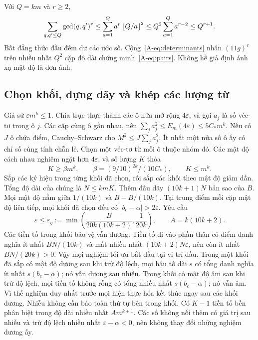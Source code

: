 Với $Q=km$ và $r\ge2$,
\begin{equation}\label{A-eq:gcd}
\sum_{q,q'\le Q}\gcd(q,q')^r
\le\sum_{a=1}^Q a^r\left\lfloor Q/a\right\rfloor^2
\le Q^2\sum_{a=1}^Q a^{r-2}\le Q^{r+1}.
\end{equation}
Bất đẳng thức đầu đếm dư các ước số. Cộng~\eqref{A-eq:determinants} nhân $(11g)^r$ trên nhiều nhất $Q^2$ cặp độ dài chứng minh~\eqref{A-eq:pairs}. Không hề giả định ánh xạ mật độ là đơn ánh.

\subsection{Chọn khối, dựng dãy và khép các lượng từ}
Giả sử $\varepsilon m^k\le1$. Chia trục thực thành các ô nửa mở rộng $4\varepsilon$, và gọi $a_j$ là số véc-tơ trong ô $j$. Các cặp cùng ô gần nhau, nên $\sum_j a_j^2\le E_m(4\varepsilon)\le5C_*m^k$. Nếu có $J$ ô chứa điểm, Cauchy--Schwarz cho $M^2\le J\sum_j a_j^2$. Ít nhất một nửa số ô ấy có chỉ số cùng tính chẵn lẻ. Chọn một véc-tơ từ mỗi ô thuộc nhóm đó. Các mật độ cách nhau nghiêm ngặt hơn $4\varepsilon$, và số lượng $K$ thỏa
\begin{equation}\label{A-eq:selection}
K\ge\beta m^k,\qquad \beta=(9/10)^{2k}/(10C_*),\qquad K\le m^k.
\end{equation}
Sắp các ký hiệu trong từng khối đã chọn, rồi sắp các khối theo mật độ giảm dần. Tổng độ dài của chúng là $N\le kmK$. Thêm đầu dãy $(10k+1)N$ bản sao của $B$. Mọi mật độ nằm giữa $1/(10k)$ và $B-B/(10k)$. Tại trung điểm mỗi cặp mật độ liên tiếp, mọi khối đã chọn đều có $|b_c-\alpha|>2\varepsilon$. Yêu cầu
\begin{equation}\label{A-eq:guard}
\varepsilon\le\varepsilon_g:=\min\left(\frac{B}{20k(10k+2)},\frac1{20k}\right),
\qquad A=k(10k+2).
\end{equation}
Các tiền tố trong khối bảo vệ vẫn dương. Tiền tố đi vào phần thân có điểm danh nghĩa ít nhất $BN/(10k)$ và mất nhiều nhất $(10k+2)N\varepsilon$, nên còn ít nhất $BN/(20k)>0$. Vậy mọi nghiệm tối ưu bắt đầu tại vị trí đầu. Trong một khối đã sắp có mật độ dương sau khi trừ độ lệch, mọi hậu tố dài $s$ có tổng danh nghĩa ít nhất $s(b_c-\alpha)$; nó vẫn dương sau nhiễu. Trong khối có mật độ âm sau khi trừ độ lệch, mọi tiền tố không rỗng có tổng nhiều nhất $s(b_c-\alpha)$; nó vẫn âm. Vì thế nghiệm duy nhất trước mọi hiện thực hóa kết thúc ngay sau các khối dương. Nhiễu không cần bảo toàn thứ tự bên trong khối. Có $K-1$ tiền tố bền phân biệt trong độ dài nhiều nhất $A m^{k+1}$. Các số không nối thêm có giá trị sau nhiễu và trừ độ lệch nhiều nhất $\varepsilon-\alpha<0$, nên không thay đổi những nghiệm dương ấy.

